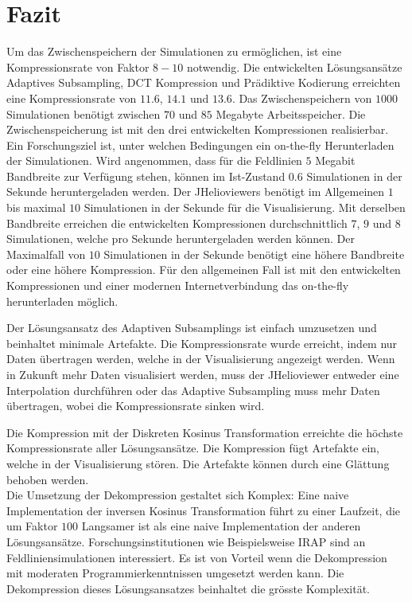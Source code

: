 \section{Fazit}
Um das Zwischenspeichern der Simulationen zu ermöglichen, ist eine Kompressionsrate von Faktor $8-10$ notwendig. Die entwickelten Lösungsansätze Adaptives Subsampling, DCT Kompression und Prädiktive Kodierung erreichten eine Kompressionsrate von $11.6$, $14.1$ und $13.6$. Das Zwischenspeichern von $1000$ Simulationen benötigt zwischen $70$ und $85$ Megabyte Arbeitsspeicher. Die Zwischenspeicherung ist mit den drei entwickelten Kompressionen realisierbar.\\
Ein Forschungsziel ist, unter welchen Bedingungen ein on-the-fly Herunterladen der Simulationen. Wird angenommen, dass für die Feldlinien $5$ Megabit Bandbreite zur Verfügung stehen, können im Ist-Zustand $0.6$ Simulationen in der Sekunde heruntergeladen werden. Der JHelioviewers benötigt im Allgemeinen $1$ bis maximal $10$ Simulationen in der Sekunde für die Visualisierung. Mit derselben Bandbreite erreichen die entwickelten Kompressionen durchschnittlich $7$, $9$ und $8$ Simulationen, welche pro Sekunde heruntergeladen werden können. Der Maximalfall von $10$ Simulationen in der Sekunde benötigt eine höhere Bandbreite oder eine höhere Kompression. Für den allgemeinen Fall ist mit den entwickelten Kompressionen und einer modernen Internetverbindung das on-the-fly herunterladen möglich. 
 
Der Lösungsansatz des Adaptiven Subsamplings ist einfach umzusetzen und beinhaltet minimale Artefakte. Die Kompressionsrate wurde erreicht, indem nur Daten übertragen werden, welche in der Visualisierung angezeigt werden. Wenn in Zukunft mehr Daten visualisiert werden, muss der JHelioviewer entweder eine Interpolation durchführen oder das Adaptive Subsampling muss mehr Daten übertragen, wobei die Kompressionsrate sinken wird.

Die Kompression mit der Diskreten Kosinus Transformation erreichte die höchste Kompressionsrate aller Lösungsansätze. Die Kompression fügt Artefakte ein, welche in der Visualisierung stören. Die Artefakte können durch eine Glättung behoben werden.\\
Die Umsetzung der Dekompression gestaltet sich Komplex: Eine naive Implementation der inversen Kosinus Transformation führt zu einer Laufzeit, die um Faktor $100$ Langsamer ist als eine naive Implementation der anderen Lösungsansätze. Forschungsinstitutionen wie Beispielsweise IRAP\cite{website:irap} sind an Feldliniensimulationen interessiert. Es ist von Vorteil wenn die Dekompression mit moderaten Programmierkenntnissen umgesetzt werden kann. Die Dekompression dieses Lösungsansatzes beinhaltet die grösste Komplexität.

